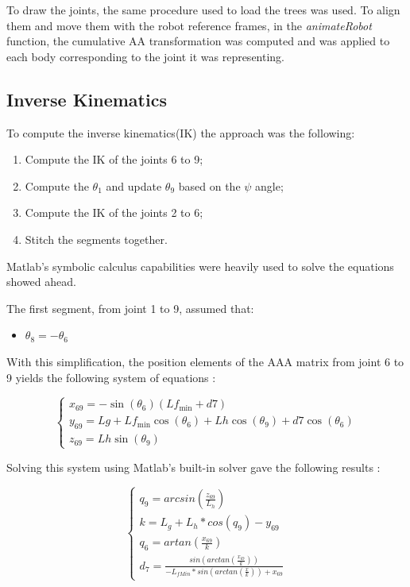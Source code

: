 \documentclass{report}
\begin{document}
To draw the joints, the same procedure used to load the trees was used. To align
them and move them with the robot reference frames, in the \textit{animateRobot}
function, the cumulative AA transformation was computed and was applied to each
body corresponding to the joint it was representing.

\subsection{Inverse Kinematics}

To compute the inverse kinematics(IK) the approach was the following: \begin{enumerate}
    \item Compute the IK of the joints 6 to 9;
    \item Compute the $\theta_1$ and update $\theta_9$ based on the $\psi$ angle;
    \item Compute the IK of the joints 2 to 6;
    \item Stitch the segments together.
\end{enumerate}

Matlab's symbolic calculus capabilities were heavily used to solve the equations
showed ahead.

The first segment, from joint 1 to 9, assumed that:\begin{itemize}
    \item $\theta_8 = -\theta_6$
\end{itemize}

With this simplification, the position elements of the AAA matrix from joint 6
to 9 yields the following system of equations :

\begin{equation}
    \begin{cases}
        x_{69} = -\sin(\theta_6)(Lf_{\text{min}} + d7)                                    \\
        y_{69} = Lg + Lf_{\text{min}}\cos(\theta_6) + Lh\cos(\theta_9) + d7\cos(\theta_6) \\
        z_{69} = Lh\sin(\theta_9)
    \end{cases}
\end{equation}

Solving this system using Matlab's built-in solver gave the following results :

\begin{equation}
    \begin{cases}
        q_9 = arcsin(\frac{z_{69}}{L_h}) \\
        k = L_g + L_h*cos(q_9)-y_{69}    \\
        q_6 = artan(\frac{x_{69}}{k})    \\
        d_7 = \frac{sin(arctan(\frac{x_{69}}{k}))}{-L_{fMin}*sin(arctan(\frac{x}{k}))+x_{69}}
    \end{cases}
\end{equation}
\end{document}
